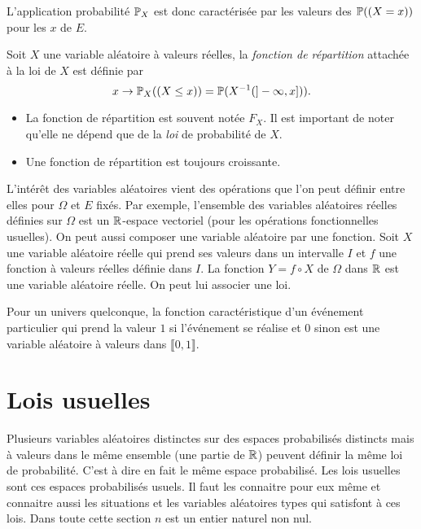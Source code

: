 L'application probabilité $\mathbb{P}_X$ est donc caractérisée par les valeurs des $\mathbb{P}((X=x))$ pour les $x$ de $E$. \newline
{}
\begin{defi}
Soit $X$ une variable aléatoire à valeurs réelles, la \emph{fonction de répartition} attachée à la loi de $X$ est définie par 
\begin{displaymath}
 x\rightarrow \mathbb{P}_X((X\leq x)) = \mathbb{P}(X^{-1}(]-\infty, x])).
\end{displaymath}
\end{defi}
\begin{rems}
\begin{itemize}
  \item La fonction de répartition est souvent notée $F_X$. Il est important de noter qu'elle ne dépend que de la \emph{loi} de probabilité de $X$.
  \item Une fonction de répartition est toujours croissante.
\end{itemize}
\end{rems}
L'intérêt des variables aléatoires vient des opérations que l'on peut définir entre elles pour $\Omega$ et $E$ fixés. Par exemple, l'ensemble des variables aléatoires réelles définies sur $\Omega$ est un $\mathbb{R}$-espace vectoriel (pour les opérations fonctionnelles usuelles).\newline
On peut aussi composer une variable aléatoire par une fonction.\newline
Soit $X$ une variable aléatoire réelle qui prend ses valeurs dans un intervalle $I$ et $f$ une fonction à valeurs réelles définie dans $I$. La fonction $Y=f\circ X$ de $\Omega$ dans $\mathbb{R}$ est une variable aléatoire réelle. On peut lui associer une loi.
\begin{exple}
  Pour un univers quelconque, la fonction caractéristique d'un événement particulier qui prend la valeur $1$ si l'événement se réalise et $0$ sinon est une variable aléatoire à valeurs dans $\llbracket 0, 1\rrbracket$.
\end{exple}
\newpage
\section{Lois usuelles}
Plusieurs variables aléatoires distinctes sur des espaces probabilisés distincts mais à valeurs dans le même ensemble (une partie de $\mathbb{R}$) peuvent définir la même loi de probabilité. C'est à dire en fait le même espace probabilisé. Les lois usuelles sont ces espaces probabilisés usuels. Il faut les connaitre pour eux même et connaitre aussi les situations et les variables aléatoires types qui satisfont à ces lois.\newline
Dans toute cette section $n$ est un entier naturel non nul.
